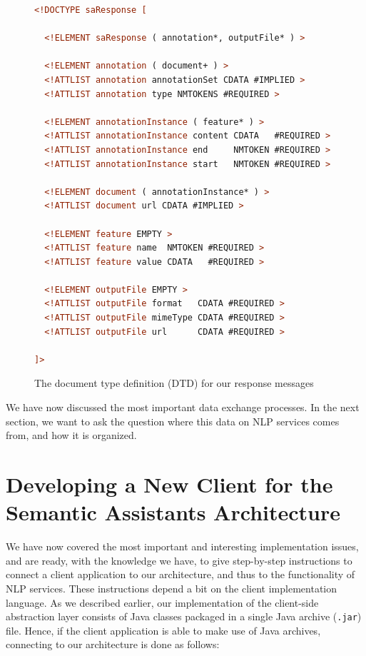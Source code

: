 \begin{figure}
\begin{lstlisting}[language=XML,xleftmargin=8mm,columns=flexible]
<!DOCTYPE saResponse [

  <!ELEMENT saResponse ( annotation*, outputFile* ) >

  <!ELEMENT annotation ( document+ ) >
  <!ATTLIST annotation annotationSet CDATA #IMPLIED >
  <!ATTLIST annotation type NMTOKENS #REQUIRED >

  <!ELEMENT annotationInstance ( feature* ) >
  <!ATTLIST annotationInstance content CDATA   #REQUIRED >
  <!ATTLIST annotationInstance end     NMTOKEN #REQUIRED >
  <!ATTLIST annotationInstance start   NMTOKEN #REQUIRED >

  <!ELEMENT document ( annotationInstance* ) >
  <!ATTLIST document url CDATA #IMPLIED >

  <!ELEMENT feature EMPTY >
  <!ATTLIST feature name  NMTOKEN #REQUIRED >
  <!ATTLIST feature value CDATA   #REQUIRED >

  <!ELEMENT outputFile EMPTY >
  <!ATTLIST outputFile format   CDATA #REQUIRED >
  <!ATTLIST outputFile mimeType CDATA #REQUIRED >
  <!ATTLIST outputFile url      CDATA #REQUIRED >

]>
\end{lstlisting}
\vspace*{-2mm}
\caption{The document type definition (DTD) for our response messages}
\label{list:dtd}
\end{figure}

We have now discussed the most important data exchange processes. In
the next section, we want to ask the question where this data on NLP
services comes from, and how it is organized.

\section{Developing a New Client for the Semantic Assistants Architecture}
We have now covered the most important and interesting implementation
issues, and are ready, with the knowledge we have, to give
step-by-step instructions to connect a client application to our
architecture, and thus to the functionality of NLP services. These
instructions depend a bit on the client implementation language. As we
described earlier, our implementation of the client-side abstraction
layer consists of Java classes packaged in a single Java archive
(\texttt{.jar}) file. Hence, if the client application is able to make
use of Java archives, connecting to our architecture is done as
follows:

